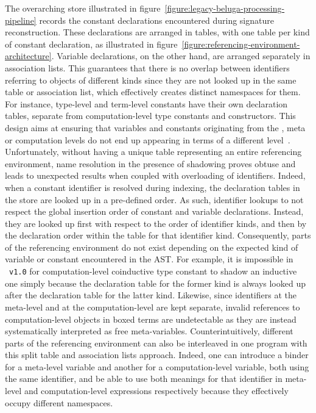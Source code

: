 The overarching store illustrated in figure~\ref{figure:legacy-beluga-processing-pipeline} records the constant declarations encountered during signature reconstruction.
These declarations are arranged in tables, with one table per kind of constant declaration, as illustrated in figure~\ref{figure:referencing-environment-architecture}.
Variable declarations, on the other hand, are arranged separately in association lists.
This guarantees that there is no overlap between identifiers referring to objects of different kinds since they are not looked up in the same table or association list, which effectively creates distinct namespaces for them.
For instance, \LF type-level and term-level constants have their own declaration tables, separate from computation-level type constants and constructors.
This design aims at ensuring that variables and constants originating from the \LF, meta or computation levels do not end up appearing in terms of a different level~\cite{germain2010implementation}.
Unfortunately, without having a unique table representing an entire referencing environment, name resolution in the presence of shadowing proves obtuse and leads to unexpected results when coupled with overloading of identifiers.
Indeed, when a constant identifier is resolved during indexing, the declaration tables in the store are looked up in a pre-defined order.
As such, identifier lookups to not respect the global insertion order of constant and variable declarations.
Instead, they are looked up first with respect to the order of identifier kinds, and then by the declaration order within the table for that identifier kind.
Consequently, parts of the referencing environment do not exist depending on the expected kind of variable or constant encountered in the \ac{AST}.
For example, it is impossible in \Beluga~\texttt{v1.0} for computation-level coinductive type constant to shadow an inductive one simply because the declaration table for the former kind is always looked up after the declaration table for the latter kind.
Likewise, since identifiers at the meta-level and at the computation-level are kept separate, invalid references to computation-level objects in boxed terms are undetectable as they are instead systematically interpreted as free meta-variables.
Counterintuitively, different parts of the referencing environment can also be interleaved in one program with this split table and association lists approach.
Indeed, one can introduce a binder for a meta-level variable and another for a computation-level variable, both using the same identifier, and be able to use both meanings for that identifier in meta-level and computation-level expressions respectively because they effectively occupy different namespaces.
